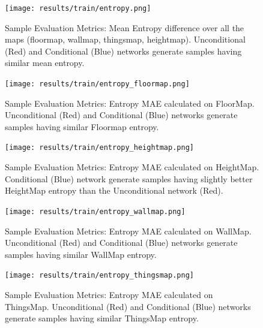 \begin{figure}[!htb] 
	\begin{minipage}[b]{0.9\linewidth}
		\centering
		\texttt{[image: results/train/entropy.png]} 
		\caption[Sample Evaluation Metrics: Entropy] {Sample Evaluation Metrics: Mean Entropy difference over all the maps (floormap, wallmap, thingsmap, heightmap). Unconditional (Red) and Conditional (Blue) networks generate samples having similar mean entropy. }
		\label{fig:train-entropy-mean}
	\end{minipage}
\end{figure}

\begin{figure}[!htb] 
	\begin{minipage}[t]{0.45\linewidth}
	\centering
	\texttt{[image: results/train/entropy\_floormap.png]} 
	\caption[Sample Evaluation Metrics: Entropy (Floormap)]{Sample Evaluation Metrics: Entropy MAE calculated on FloorMap. Unconditional (Red) and Conditional (Blue) networks generate samples having similar Floormap entropy.}
	\label{fig:train-entropy-floormap}
\end{minipage}
\hfil
\begin{minipage}[t]{0.45\linewidth}
	\centering
	\texttt{[image: results/train/entropy\_heightmap.png]} 
	\caption[Sample Evaluation Metrics: Entropy (HeightMap)]{Sample Evaluation Metrics: Entropy MAE calculated on HeightMap. Conditional (Blue) network generate samples having slightly better HeightMap entropy than the Unconditional network (Red).}
	\label{fig:train-entropy-heightmap}
\end{minipage}

\begin{minipage}[t]{0.45\linewidth}
	\centering
	\texttt{[image: results/train/entropy\_wallmap.png]} 
	\caption[Sample Evaluation Metrics: Entropy (WallMap)]{Sample Evaluation Metrics: Entropy MAE calculated on WallMap. Unconditional (Red) and Conditional (Blue) networks generate samples having similar WallMap entropy.}
	\label{fig:train-entropy-wallmap}
\end{minipage}
\hfil
\begin{minipage}[t]{0.45\linewidth}
	\centering
	\texttt{[image: results/train/entropy\_thingsmap.png]} 
	\caption[Sample Evaluation Metrics: Entropy (ThingsMap)]{Sample Evaluation Metrics: Entropy MAE calculated on ThingsMap. Unconditional (Red) and Conditional (Blue) networks generate samples having similar ThingsMap entropy.}
	\label{fig:train-entropy-thingsmap}
\end{minipage}
\end{figure}

